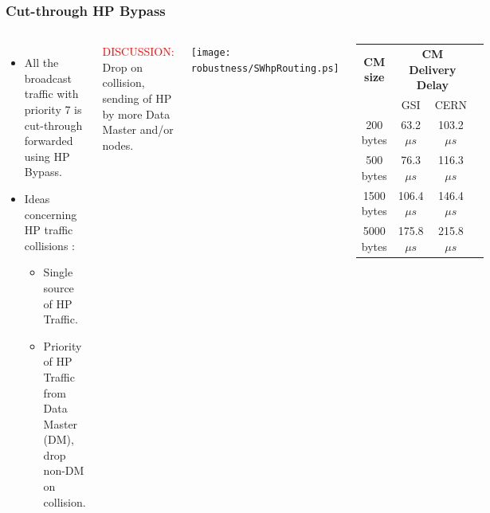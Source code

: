 \documentclass[]{beamer}
\begin{document}
\begin{frame}
  \frametitle{Cut-through HP Bypass}
 
  \begin{columns}[c]
  \column{2.8in}  %
  \begin{itemize}
  \item All the broadcast traffic with priority 7 is cut-through forwarded
        using  HP Bypass.
  \item Ideas concerning HP traffic collisions :
  \begin{itemize}
    \item Single source of HP Traffic.
    \item Priority of HP Traffic from Data Master (DM), drop non-DM on
          collision.
  \end{itemize}
  \end{itemize}
\centering
\textcolor{red}{DISCUSSION:} \\
Drop on collision, sending of HP by more Data Master and/or nodes.

  \column{2.3in}
  \centering
  \texttt{[image: robustness/SWhpRouting.ps]}
  {\tiny
  \begin{table}[ht]
	  \begin{tabular}{| c | c | c | c |}          \hline
  \textbf{CM size}& \multicolumn{2}{|c|}{\textbf{CM Delivery Delay}}\\
		&    GSI           & CERN          \\ \hline
  200 bytes      &  63.2$\mu s$     & 103.2$\mu s$    \\ \hline
  500 bytes      &  76.3$\mu s$     & 116.3$\mu s$    \\ \hline
  1500 bytes     & 106.4$\mu s$     & 146.4$\mu s$    \\ \hline
  5000 bytes     & 175.8$\mu s$     & 215.8$\mu s$    \\ \hline
  \end{tabular}
  \label{tab:CMspDelay}
  \end{table}
  }

  \end{columns}

\end{frame}


\end{document}
